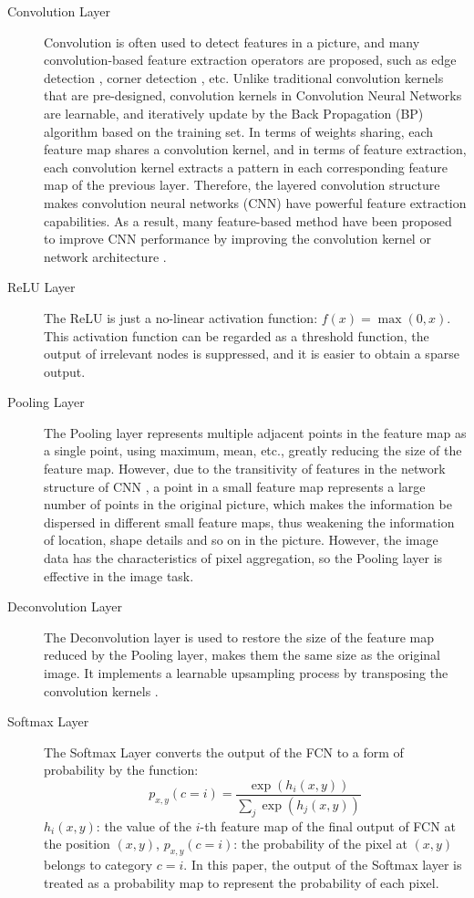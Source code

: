 \begin{description}
  \item[Convolution Layer] Convolution is often used to detect features in a picture, and many convolution-based feature extraction operators are proposed, such as edge detection \cite{Convolution:edge:canny1987computational}, corner detection \cite{Convolution:corner:harris1988combined}, etc. Unlike traditional convolution kernels that are pre-designed, convolution kernels in Convolution Neural Networks are learnable, and iteratively update by the Back Propagation (BP) algorithm based on the training set. In terms of weights sharing, each feature map shares a convolution kernel, and in terms of feature extraction, each convolution kernel extracts a pattern in each corresponding feature map of the previous layer. Therefore, the layered convolution structure makes convolution neural networks (CNN) have powerful feature extraction capabilities. As a result, many feature-based method have been proposed to improve CNN performance by improving the convolution kernel \cite{CNN:kernel:zhou2017oriented} or network architecture \cite{CNN:arch:he2016deep}.
  \item[ReLU Layer] The ReLU is just a no-linear activation function: $f(x) = \max(0,x)$. This activation function can be regarded as a threshold function, the output of irrelevant nodes is suppressed, and it is easier to obtain a sparse output.
  \item[Pooling Layer] The Pooling layer represents multiple adjacent points in the feature map as a single point, using maximum, mean, etc., greatly reducing the size of the feature map. However, due to the transitivity of features in the network structure of CNN \cite{CNN:pooling:zhou2016learning}, a point in a small feature map represents a large number of points in the original picture, which makes the information be dispersed in different small feature maps, thus weakening the information of location, shape details and so on in the picture. However, the image data has the characteristics of pixel aggregation, so the Pooling layer is effective in the image task.
  \item[Deconvolution Layer] The Deconvolution layer is used to restore the size of the feature map reduced by the Pooling layer, makes them the same size as the original image. It implements a learnable upsampling process by transposing the convolution kernels \cite{CNN:deconvolution:zeiler2011adaptive}.
  \item[Softmax Layer] The Softmax Layer converts the output of the FCN to a form of probability by the function:
      $$p_{x,y}(c=i) = \frac{\exp(h_i(x,y))}{\sum_j \exp(h_j(x,y))}$$
      $h_i(x,y)$: the value of the $i$-th feature map of the final output of FCN at the position $(x,y)$, $p_{x,y}(c=i)$: the probability of the pixel at $(x,y)$ belongs to category $c=i$. In this paper, the output of the Softmax layer is treated as a probability map to represent the probability of each pixel.
\end{description}

